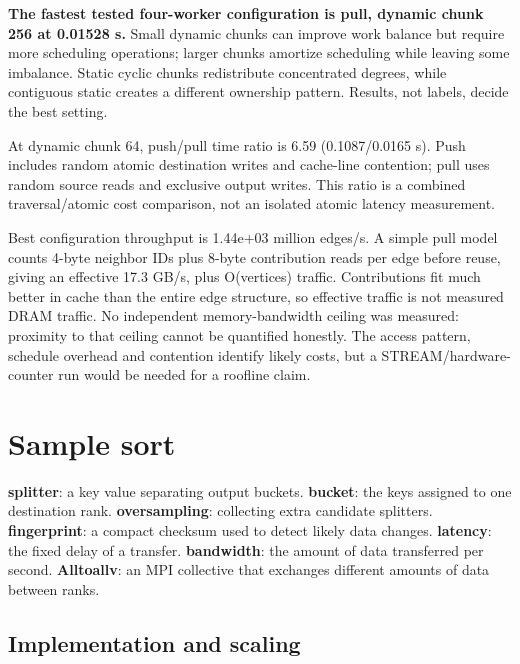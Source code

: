 \documentclass[11pt,a4paper]{article}
\newcommand{\term}[2]{\textbf{#1}: #2.}
\begin{document}
\textbf{The fastest tested four-worker configuration is pull, dynamic chunk 256 at 0.01528 s.} Small dynamic chunks can improve work balance but require more scheduling operations; larger chunks amortize scheduling while leaving some imbalance. Static cyclic chunks redistribute concentrated degrees, while contiguous static creates a different ownership pattern. Results, not labels, decide the best setting.


At dynamic chunk 64, push/\allowbreak{}pull time ratio is 6.59 (0.1087/\allowbreak{}0.0165 s). Push includes random atomic destination writes and cache-line contention; pull uses random source reads and exclusive output writes. This ratio is a combined traversal/\allowbreak{}atomic cost comparison, not an isolated atomic latency measurement.


Best configuration throughput is 1.44e+03 million edges/\allowbreak{}s. A simple pull model counts 4-byte neighbor IDs plus 8-byte contribution reads per edge before reuse, giving an effective 17.3 GB/\allowbreak{}s, plus O(vertices) traffic. Contributions fit much better in cache than the entire edge structure, so effective traffic is not measured DRAM traffic. No independent memory-bandwidth ceiling was measured: proximity to that ceiling cannot be quantified honestly. The access pattern, schedule overhead and contention identify likely costs, but a STREAM/\allowbreak{}hardware-counter run would be needed for a roofline claim.


\FloatBarrier

\section{Sample sort}

\begin{tcolorbox}[title=Terms used in this section]\small \term{splitter}{a key value separating output buckets} \term{bucket}{the keys assigned to one destination rank} \term{oversampling}{collecting extra candidate splitters} \term{fingerprint}{a compact checksum used to detect likely data changes} \term{latency}{the fixed delay of a transfer} \term{bandwidth}{the amount of data transferred per second} \term{Alltoallv}{an MPI collective that exchanges different amounts of data between ranks}\end{tcolorbox}

\subsection{Implementation and scaling}
\end{document}
